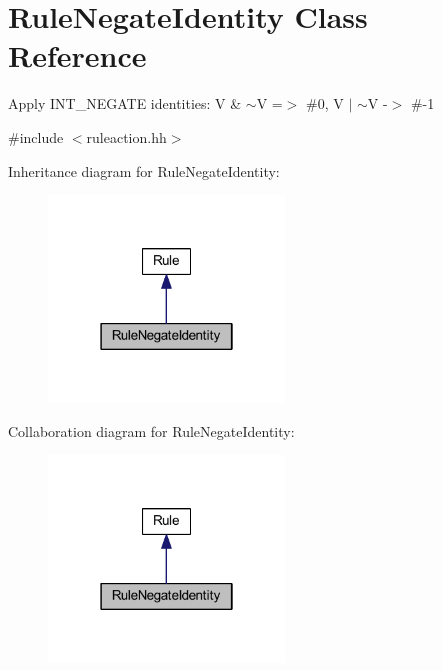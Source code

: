 \hypertarget{class_rule_negate_identity}{}\section{Rule\+Negate\+Identity Class Reference}
\label{class_rule_negate_identity}


Apply I\+N\+T\+\_\+\+N\+E\+G\+A\+TE identities\+: {\ttfamily V \& $\sim$V =$>$ \#0, V $\vert$ $\sim$V -\/$>$ \#-\/1}  




{\ttfamily \#include $<$ruleaction.\+hh$>$}



Inheritance diagram for Rule\+Negate\+Identity\+:
\nopagebreak
\begin{figure}[H]
\begin{center}
\leavevmode
\includegraphics[width=178pt]{class_rule_negate_identity__inherit__graph}
\end{center}
\end{figure}


Collaboration diagram for Rule\+Negate\+Identity\+:
\nopagebreak
\begin{figure}[H]
\begin{center}
\leavevmode
\includegraphics[width=178pt]{class_rule_negate_identity__coll__graph}
\end{center}
\end{figure}
